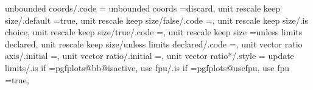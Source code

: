 {{{{{{{{{{{{{{{{{{{{{{{{{{{{{{{{{{{{{{{{{{{{{{{{{{{{{{{{{{{{{{{{{{{{{{{{{{{{{{{{{{{{{{{{{{{{{{{{{{{unbounded coords/.code                                             ={%
unbounded coords                                                   =discard,                                                                                                                           
unit rescale keep size/.default                                    =true,                                                                                                                              
unit rescale keep size/false/.code                                 ={\def\pgfplots@unit@vector@rescale@keep@size{0}},                                                                                  
unit rescale keep size/.is choice,
unit rescale keep size/true/.code                                  ={\def\pgfplots@unit@vector@rescale@keep@size{1}},                                                                                  
unit rescale keep size                                             =unless limits declared,                                                                                                            
unit rescale keep size/unless limits declared/.code                ={\def\pgfplots@unit@vector@rescale@keep@size{2}},                                                                                  
unit vector ratio axis/.initial                                    =,%
unit vector ratio/.initial                                         =,%
unit vector ratio*/.style                                          ={%
update limits/.is if                                               =pgfplots@bb@isactive,                                                                                                              
use fpu/.is if                                                     =pgfplots@usefpu,                                                                                                                   
use fpu                                                            =true,                                                                                                                              
}}}}}}}}}}}}}}}}}}}}}}}}}}}}}}}}}}}}}}}}}}}}}}}}}}}}}}}}}}}}}}}}}}}}}}}}}}}}}}}}}}}}}}}}}}}}}}}}}}}}}
